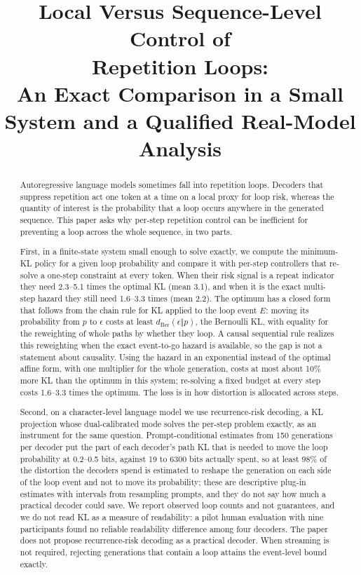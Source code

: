 \documentclass[11pt]{article}
\title{\textbf{Local Versus Sequence-Level Control of\\Repetition Loops:}\\[4pt]
\large An Exact Comparison in a Small System and a Qualified Real-Model Analysis}
\author{}
\date{}
\begin{document}
\maketitle

\begin{abstract}
Autoregressive language models sometimes fall into repetition loops. Decoders that suppress repetition act one token at a time on a local proxy for loop risk, whereas the quantity of interest is the probability that a loop occurs anywhere in the generated sequence. This paper asks why per-step repetition control can be inefficient for preventing a loop across the whole sequence, in two parts.

First, in a finite-state system small enough to solve exactly, we compute the minimum-KL policy for a given loop probability and compare it with per-step controllers that re-solve a one-step constraint at every token. When their risk signal is a repeat indicator they need 2.3--5.1 times the optimal KL (mean 3.1), and when it is the exact multi-step hazard they still need 1.6--3.3 times (mean 2.2). The optimum has a closed form that follows from the chain rule for KL applied to the loop event $E$: moving its probability from $p$ to $\epsilon$ costs at least $d_{\mathrm{Ber}}(\epsilon\Vert p)$, the Bernoulli KL, with equality for the reweighting of whole paths by whether they loop. A causal sequential rule realizes this reweighting when the exact event-to-go hazard is available, so the gap is not a statement about causality. Using the hazard in an exponential instead of the optimal affine form, with one multiplier for the whole generation, costs at most about 10\% more KL than the optimum in this system; re-solving a fixed budget at every step costs 1.6--3.3 times the optimum. The loss is in how distortion is allocated across steps.

Second, on a character-level language model we use recurrence-risk decoding, a KL projection whose dual-calibrated mode solves the per-step problem exactly, as an instrument for the same question. Prompt-conditional estimates from 150 generations per decoder put the part of each decoder's path KL that is needed to move the loop probability at 0.2--0.5 bits, against 19 to 6300 bits actually spent, so at least 98\% of the distortion the decoders spend is estimated to reshape the generation on each side of the loop event and not to move its probability; these are descriptive plug-in estimates with intervals from resampling prompts, and they do not say how much a practical decoder could save. We report observed loop counts and not guarantees, and we do not read KL as a measure of readability: a pilot human evaluation with nine participants found no reliable readability difference among four decoders. The paper does not propose recurrence-risk decoding as a practical decoder. When streaming is not required, rejecting generations that contain a loop attains the event-level bound exactly.
\end{abstract}
\end{document}
